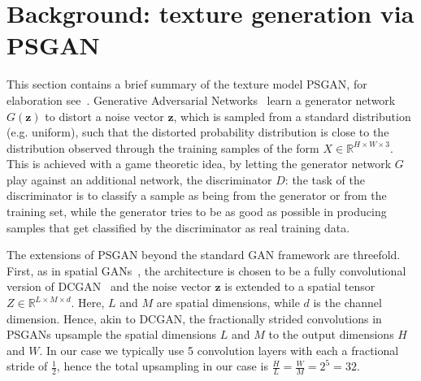 \documentclass{article}
\begin{document}

\section{Background: texture generation via PSGAN}%
\label{sec_psgan}
This section contains a brief summary of the texture model PSGAN, for elaboration see~\cite{PSGAN2017}. 
Generative Adversarial Networks~\cite{Goodfellow14} learn a generator network $G(\bm{z})$ to distort a noise vector $\bm{z}$, which is sampled from a standard distribution (e.g. uniform), such that the distorted probability distribution is close to the distribution observed through the training samples of the form $X \in \mathbb{R}^{H \times W \times 3}$. This is achieved with a game theoretic idea, by letting the generator network $G$ play against an additional network, the discriminator $D$: the task of the discriminator is to classify a sample as being from the generator or from the training set, while the generator tries to be as good as possible in producing samples that get classified by the discriminator as real training data.

The extensions of PSGAN beyond the standard GAN framework are threefold. First, as in spatial GANs~\cite{SGAN2016}, the architecture is chosen to be a fully convolutional version of DCGAN~\cite{RadfordMC15} and the noise vector $\bm{z}$ is extended to a spatial tensor $Z \in \mathbb{R}^{L \times M \times d}$. Here, $L$ and $M$ are spatial dimensions, while $d$ is the channel dimension. Hence, akin to DCGAN, the fractionally strided convolutions in PSGANs upsample the spatial dimensions $L$ and $M$ to the output dimensions $H$ and $W$. In our case we typically use 5 convolution layers with each a fractional stride of $\frac{1}{2}$, hence the total upsampling in our case is $\frac{H}{L} = \frac{W}{M} = 2^{5} = 32$.
\end{document}
